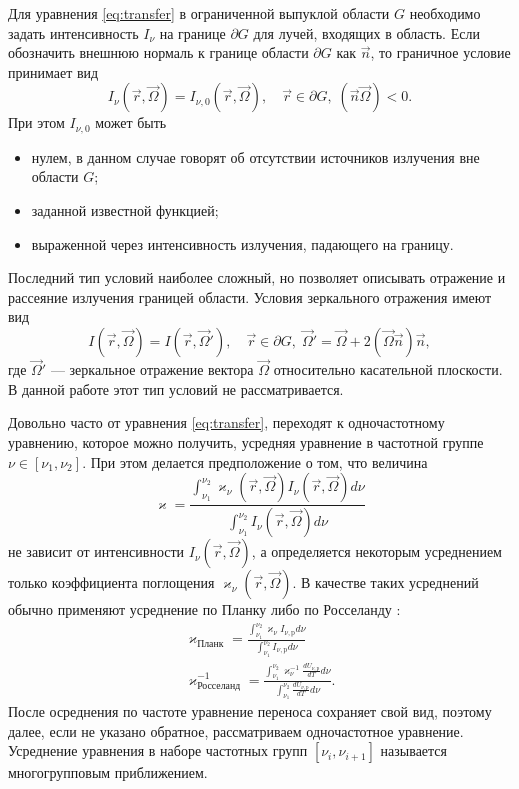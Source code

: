 Для уравнения \eqref{eq:transfer} в ограниченной выпуклой области $G$ необходимо задать интенсивность $I_\nu$ на границе $\partial G$ для лучей, входящих в область. Если обозначить внешнюю нормаль к границе области $\partial G$ как $\vec n$, то граничное условие принимает вид
\[
I_\nu(\vec r, \vec \Omega) = I_{\nu,0}(\vec r, \vec \Omega), \quad \vec r \in \partial G,\; (\vec n \vec \Omega) < 0.
\]
При этом $I_{\nu,0}$ может быть
\begin{itemize}
\item нулем, в данном случае говорят об отсутствии источников излучения вне области $G$;
\item заданной известной функцией;
\item выраженной через интенсивность излучения, падающего на границу.
\end{itemize}
Последний тип условий наиболее сложный, но позволяет описывать отражение и рассеяние излучения границей области. Условия зеркального отражения имеют вид
\[
I(\vec r, \vec \Omega) = I(\vec r, \vec \Omega'), \quad \vec r \in \partial G, \; \vec \Omega' = \vec \Omega + 2 (\vec \Omega \vec n) \vec n,
\]
где $\vec \Omega'$ --- зеркальное отражение вектора $\vec \Omega$ относительно касательной плоскости.
В данной работе этот тип условий не рассматривается.

Довольно часто от уравнения \eqref{eq:transfer}, переходят к одночастотному уравнению, которое можно получить, усредняя уравнение в частотной группе $\nu \in [\nu_1, \nu_2]$. При этом делается предположение о том, что величина
\[
\varkappa = \frac{\int_{\nu_1}^{\nu_2} \varkappa_\nu(\vec r, \vec \Omega) I_\nu(\vec r, \vec \Omega) d\nu}{
\int_{\nu_1}^{\nu_2} I_\nu(\vec r, \vec \Omega) d\nu
}
\]
не зависит от интенсивности $I_\nu(\vec r, \vec \Omega)$, а определяется некоторым усреднением только коэффициента поглощения $\varkappa_\nu(\vec r, \vec \Omega)$. В качестве таких усреднений обычно применяют усреднение по Планку либо по Росселанду \cite{zeldovich2008}:
\begin{gather*}
\varkappa_\text{Планк} = \frac{\int_{\nu_1}^{\nu_2} \varkappa_\nu I_{\nu, \text{p}} d\nu}{\int_{\nu_1}^{\nu_2} I_{\nu, \text{p}} d\nu}\\
\varkappa_\text{Росселанд}^{-1} = \frac{\int_{\nu_1}^{\nu_2} \varkappa_\nu^{-1} \frac{dU_{\nu, \text{p}}}{dT} d\nu}{\int_{\nu_1}^{\nu_2} \frac{dU_{\nu, \text{p}}}{dT} d\nu}.
\end{gather*}
После осреднения по частоте уравнение переноса сохраняет свой вид, поэтому далее, если не указано обратное, рассматриваем одночастотное уравнение. Усреднение уравнения в наборе частотных групп $[\nu_i, \nu_{i+1}]$ называется многогрупповым приближением.

